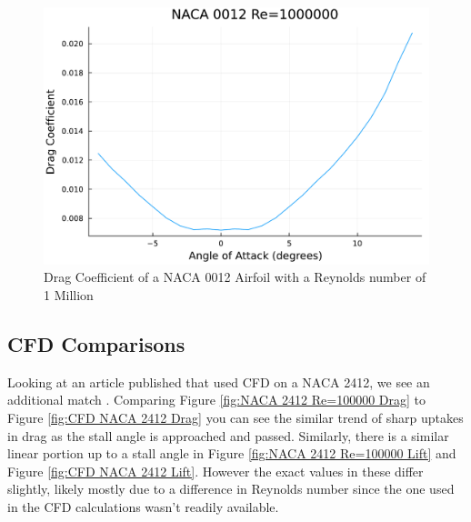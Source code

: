 \documentclass{article}
\begin{document}
\begin{figure}[h]
\begin{minipage}[b]{0.32\textwidth}
\includegraphics[width=\textwidth]{NACA 0012 Re=1000000_Drag_Coefficent_Plot.pdf}
\caption{\label{fig:NACA 0012 Drag}Drag Coefficient of a NACA 0012 Airfoil with a Reynolds number of 1 Million}
\end{minipage}
\end{figure}

\subsection{CFD Comparisons}
Looking at an article published that used CFD on a NACA 2412, we see an additional match \cite{KULSHRESHTHA20201638}. Comparing Figure \ref{fig:NACA 2412 Re=100000 Drag} to Figure \ref{fig:CFD NACA 2412 Drag} you can see the similar trend of sharp uptakes in drag as the stall angle is approached and passed. Similarly, there is a similar linear portion up to a stall angle in Figure \ref{fig:NACA 2412 Re=100000 Lift} and Figure \ref{fig:CFD NACA 2412 Lift}. However the exact values in these differ slightly, likely mostly due to a difference in Reynolds number since the one used in the CFD calculations wasn't readily available.
\end{document}
